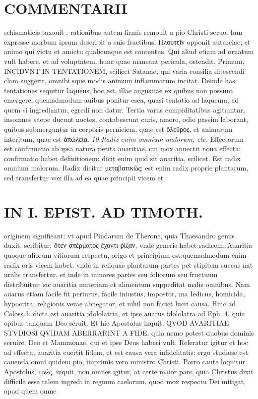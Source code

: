 \documentclass{article}
\begin{document}
\begin{pages}
\section*{COMMENTARII }
\marginpar{[ p.156 ]}\pstart schismaticis taxauit : rationibus autem firmis remouit a pio Christi seruo. Iam expresse morbum ipsum describit a suis fructibus. Πλουτεῖν opponit autarciae, et animo qui victu et amictu qualicunque est contentus. Qui aliud etiam ad ornatum vult habere, et ad voluptatem, hunc quae maneant pericula, ostendit.  \pend\pstart Primum, INCIDVNT IN TENTATIONEM, scilicet Satanae, qui varia consilia ditescendi clam suggerit, omnibi sque modis animum inflammatum incitat. Deinde has tentationes sequitur laqueus, hoc est, illae angustiae ex quibus non possunt emergere, quemadmodum auibus ponitur esca, quasi tentatio ad laqueum, ad quem si ingrediantur, egredi non datur. Tertio varns cumpiditatibus agitamtur, insomnes saepe ducunt noctes, contabescunt curis, amore, odio passim laborant, quibus submerguntur in corporis perniciem, quae est ὄλεθρος, et animarum interitum, quae est ἀπώλεια.  \pend
\textit{10 Radix enim omnium malorum, etc. }\pstart Effectorum est confirmatio ab ipsa natura petita auaritiae, cui mox annectit noua effecta: confirmatio habet definitionem: dicit enim quid sit auaritia, scilicet. Est radix omnium malorum. Radix dicitur μεταβατικῶς: est enim radix proprie plantarum, sed transfertur vox illa ad ea quae principii vicem et  \pend
\section*{IN I. EPIST. AD TIMOTH. }
\marginpar{[ p.157 ]}\pstart originem signifieant: vt apud Pindarum de Therone, quia Thaesandro genus duxit, scribitur, ὅτεν σπέρματος ἔχοντι ῥίζαν, vnde generis habet radicem. Auaritia quoque aliorum vitiorum respectu, origo et principium est:quemadmodum enim radix oris vicem habet, vnde in reliquas plantarum partes pet stipitem succus nat uralis transfertur, et inde in minores partes seu foliorum seu fructuum distribuitur: sic auaritia materiam et alimentum suppeditat malis omnibus. Nam auarus etiam facile fit periurus, facile iniustus, impostor, ma Iedicus, homicida, hypocrita, religionis verae abnegator, et nihil non faciet lucri causa. Hinc ad Coloss.3. dicta est auaritia idololatria, et ipse auarus idololatra ad Eph. 4. quia opibus tanquam Deo seruit. Et hic Apostolus inquit, QVOD AVARITIAE STVDIOSI QVIDAM ABERRARINT A FIDE, quia nemo potest duobus dominis seruire, Deo et Mammonae, qui et ipse Deus haberi vult. Referatur igitur et hoc ad effecta, auaritia euertit fidem, et est causa vera infidelitatis: ergo studiose est cauenda omni quidem pio, imprimis vero ministro Christi. Porro caute loquitur Apostolus, τινὲς, inquit, non omnes igitur, at certe maior pars, quia Christus dixit difficile esse talem ingredi in regnum caelorum, quod mox respectu Dei mitigat, apud quem omne  \pend

\end{pages}
\end{document}
